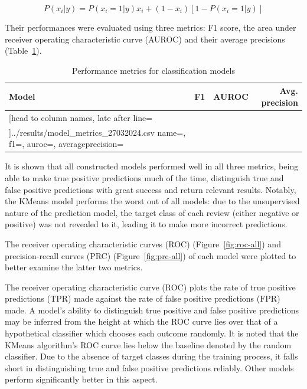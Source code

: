 \documentclass[12pt, a4paper]{pancake-article}
\begin{document}
\begin{equation}
  P\left(x_i|y \right) = P\left(x_i = 1 | y\right)x_i + \left(1 - x_i\right)\left[1 - P\left(x_i=1|y\right)\right]
  \label{eq:nb}
\end{equation}

Their performances were evaluated using three metrics: F1 score, the area under receiver operating characteristic
curve (AUROC) and their average precisions (Table~\ref{tab:metrics}).

\begin{table}
	\centering
	\caption{Performance metrics for classification models}
	\label{tab:metrics}
	\begin{tabular}{lrrr}
		\toprule
		\textbf{Model} & \textbf{F1} & \textbf{AUROC} & \textbf{Avg. precision} \\
		\midrule
		\csvreader[head to column names, late after line=\\]{../results/model_metrics_27032024.csv}{
			name=\name,
			f1=\fone,
			auroc=\auroc,
			averageprecision=\avgprecision
		}{
		\name          & \fone       & \auroc         & \averageprecision
		}
		\bottomrule
	\end{tabular}
\end{table}

It is shown that all constructed models performed well in all three metrics, being
able to make true positive predictions much of the time, distinguish true and false
positive predictions with great success and return relevant results. Notably, the KMeans
model performs the worst out of all models: due to the unsupervised nature of the prediction
model, the target class of each review (either negative or positive) was not revealed to it,
leading it to make more incorrect predictions.

The receiver operating characteristic curves (ROC) (Figure~\ref{fig:roc-all}) and precision-recall curves (PRC)
(Figure~\ref{fig:prc-all}) of each model were plotted to better examine the latter two metrics.

The receiver operating characteristic curve (ROC) plots the rate of true positive predictions ($\text{TPR}$) made against the
rate of false positive predictions ($\text{FPR}$) made. A model's ability to distinguish
true positive and false positive predictions may be inferred from the height at which the ROC curve
lies over that of a hypothetical classifier which chooses each outcome randomly. It is noted that
the KMeans algorithm's ROC curve lies below the baseline denoted by the random classifier.
Due to the absence of target classes during the training process, it falls short in distinguishing
true and false positive predictions reliably. Other models perform significantly better in this aspect.
\end{document}
